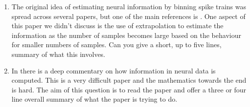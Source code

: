 \documentclass[12pt]{article}
\begin{document}
\begin{enumerate}
\item The original idea of estimating neural information by binning
  spike trains was spread across several papers, but one of the main
  references is \cite{StrongEtAl1998}. One aspect of this paper we
  didn't discuss is the use of extrapolation to estimate the
  information as the number of samples becomes large based on the
  behaviour for smaller numbers of samples. Can you give a short, up
  to five lines, summary of what this involves.

\item In \cite{NemenmanEtAl2004} there is a deep commentary on how
  information in neural data is computed. This is a very difficult
  paper and the mathematics towards the end is hard. The aim of this
  question is to read the paper and offer a three or four line overall
  summary of what the paper is trying to do.
\end{enumerate}


{}
\end{document}
